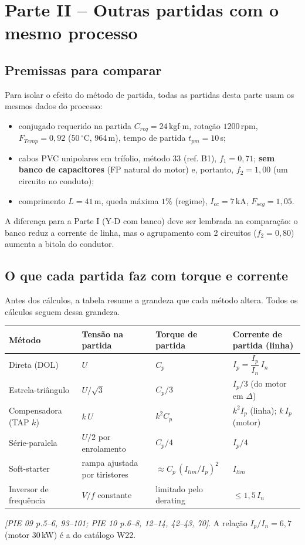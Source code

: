 \documentclass[11pt,a4paper]{article}
\newcommand{\src}[1]{\textit{[#1]}}
\begin{document}
\section{Parte II -- Outras partidas com o mesmo processo}

\subsection{Premissas para comparar}
Para isolar o efeito do m\'etodo de partida, todas as partidas desta parte usam os mesmos dados do processo:
\begin{itemize}[leftmargin=1.2em]
\item conjugado requerido na partida $C_{req}=24$\,kgf$\cdot$m, rota\c{c}\~ao $1200$\,rpm, $F_{Temp}=0{,}92$ (50\,$^\circ$C, 964\,m), tempo de partida $t_{pm}=10$\,s;
\item cabos PVC unipolares em tr\'ifolio, m\'etodo 33 (ref. B1), $f_1=0{,}71$; \textbf{sem banco de capacitores} (FP natural do motor) e, portanto, $f_2=1{,}00$ (um circuito no conduto);
\item comprimento $L=41$\,m, queda m\'axima $1\%$ (regime), $I_{cc}=7$\,kA, $F_{seg}=1{,}05$.
\end{itemize}
A diferen\c{c}a para a Parte I (Y-D com banco) deve ser lembrada na compara\c{c}\~ao: o banco reduz a corrente de linha, mas o agrupamento com 2 circuitos ($f_2=0{,}80$) aumenta a bitola do condutor.

\subsection{O que cada partida faz com torque e corrente}
Antes dos c\'alculos, a tabela resume a grandeza que cada m\'etodo altera. Todos os c\'alculos seguem dessa grandeza.

\begin{center}
\begin{tabularx}{\linewidth}{@{}>{\raggedright}p{2.9cm}>{\raggedright}p{3.6cm}>{\raggedright}p{3.5cm}X@{}}
\toprule
M\'etodo & Tens\~ao na partida & Torque de partida & Corrente de partida (linha) \\
\midrule
Direta (DOL) & $U$ & $C_p$ & $I_p = \dfrac{I_p}{I_n}\,I_n$ \\
Estrela-tri\^angulo & $U/\sqrt{3}$ & $C_p/3$ & $I_p/3$ (do motor em $\Delta$) \\
Compensadora (TAP $k$) & $k\,U$ & $k^2 C_p$ & $k^2 I_p$ (linha); $k\,I_p$ (motor) \\
S\'erie-paralela & $U/2$ por enrolamento & $C_p/4$ & $I_p/4$ \\
Soft-starter & rampa ajustada por tiristores & $\approx C_p\,(I_{lim}/I_p)^2$ & $I_{lim}$ \\
Inversor de frequ\^encia & $V/f$ constante & limitado pelo derating & $\le 1{,}5\,I_n$ \\
\bottomrule
\end{tabularx}
\end{center}
\src{PIE 09 p.5--6, 93--101; PIE 10 p.6--8, 12--14, 42--43, 70}. A rela\c{c}\~ao $I_p/I_n = 6{,}7$ (motor 30\,kW) \'e a do cat\'alogo W22.
\end{document}
